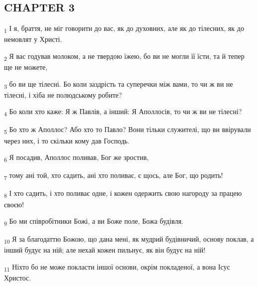 \subsection{CHAPTER 3}
\begin{tcolorbox}
\textsubscript{1} І я, браття, не міг говорити до вас, як до духовних, але як до тілесних, як до немовлят у Христі.
\end{tcolorbox}
\begin{tcolorbox}
\textsubscript{2} Я вас годував молоком, а не твердою їжею, бо ви не могли її їсти, та й тепер ще не можете,
\end{tcolorbox}
\begin{tcolorbox}
\textsubscript{3} бо ви ще тілесні. Бо коли заздрість та суперечки між вами, то чи ж ви не тілесні, і хіба не полюдському робите?
\end{tcolorbox}
\begin{tcolorbox}
\textsubscript{4} Бо коли хто каже: Я ж Павлів, а інший: Я Аполлосів, то чи ж ви не тілесні?
\end{tcolorbox}
\begin{tcolorbox}
\textsubscript{5} Бо хто ж Аполлос? Або хто то Павло? Вони тільки служителі, що ви ввірували через них, і то скільки кому дав Господь.
\end{tcolorbox}
\begin{tcolorbox}
\textsubscript{6} Я посадив, Аполлос поливав, Бог же зростив,
\end{tcolorbox}
\begin{tcolorbox}
\textsubscript{7} тому ані той, хто садить, ані хто поливає, є щось, але Бог, що родить!
\end{tcolorbox}
\begin{tcolorbox}
\textsubscript{8} І хто садить, і хто поливає одне, і кожен одержить свою нагороду за працею своєю!
\end{tcolorbox}
\begin{tcolorbox}
\textsubscript{9} Бо ми співробітники Божі, а ви Боже поле, Божа будівля.
\end{tcolorbox}
\begin{tcolorbox}
\textsubscript{10} Я за благодаттю Божою, що дана мені, як мудрий будівничий, основу поклав, а інший будує на ній; але нехай кожен пильнує, як він будує на ній!
\end{tcolorbox}
\begin{tcolorbox}
\textsubscript{11} Ніхто бо не може покласти іншої основи, окрім покладеної, а вона Ісус Христос.
\end{tcolorbox}
